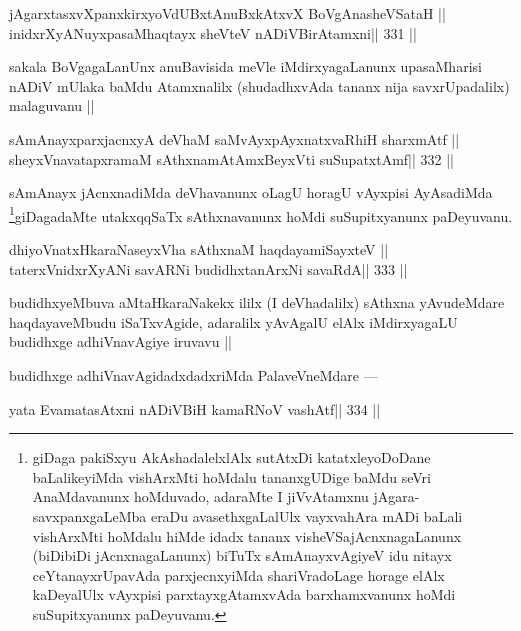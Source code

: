 \begin{shl}
jAgarxtasxvXpanxkirxyoVdUBxtAnuBxkAtxvX BoVgAnasheVSataH ||
inidxrXyANuyxpasaMhaqtayx sheVteV nADiVBirAtamxni\hfill || 331 ||
\end{shl}

\begin{artha}
sakala BoVgagaLanUnx anuBavisida meVle iMdirxyagaLanunx upasaMharisi nADiV mUlaka baMdu Atamxnalilx (shudadhxvAda tananx nija savxrUpadalilx) malaguvanu ||
\end{artha}

\begin{shl}
sAmAnayxparxjacnxyA deVhaM saMvAyxpAyxnatxvaRhiH sharxmAtf ||
sheyxVnavatapxramaM sAthxnamAtAmx\s BeyxVti suSupatxtAmf\hfill || 332 ||
\end{shl}

\begin{artha}
sAmAnayx jAcnxnadiMda deVhavanunx oLagU horagU vAyxpisi AyAsadiMda \footnote[1]{giDaga pakiSxyu AkAshadalelxlAlx sutAtxDi katatxleyoDoDane baLalikeyiMda vishArxMti hoMdalu tananxgUDige baMdu seVri AnaMdavanunx hoMduvado, adaraMte I jiVvAtamxnu jAgara-savxpanxgaLeMba eraDu avasethxgaLalUlx vayxvahAra mADi baLali vishArxMti hoMdalu hiMde idadx tananx visheVSajAcnxnagaLanunx (biDibiDi jAcnxnagaLanunx) biTuTx sAmAnayxvAgiyeV idu nitayx ceYtanayxrUpavAda parxjecnxyiMda shariVradoLage horage elAlx kaDeyalUlx vAyxpisi parxtayxgAtamxvAda barxhamxvanunx hoMdi suSupitxyanunx paDeyuvanu.}giDagadaMte utakxqqSaTx sAthxnavanunx hoMdi suSupitxyanunx paDeyuvanu.
\end{artha}

\begin{shl}
dhiyoV\s natxHkaraNaseyxVha sAthxnaM haqdayamiSayxteV ||
taterxVnidxrXyANi savARNi budidhxtanArxNi savaRdA\hfill || 333 ||
\end{shl}

\begin{artha}
budidhxyeMbuva aMtaHkaraNakekx ililx (I deVhadalilx) sAthxna yAvudeMdare haqdayaveMbudu iSaTxvAgide, adaralilx yAvAgalU elAlx iMdirxyagaLU budidhxge adhiVnavAgiye iruvavu ||
\end{artha}

\begin{artha}
budidhxge adhiVnavAgidadxdadxriMda PalaveVneMdare ---
\end{artha}

\begin{shl}
yata EvamatasAtxni nADiVBiH kamaRNoV vashAtf\hfill || 334 ||
\end{shl}

